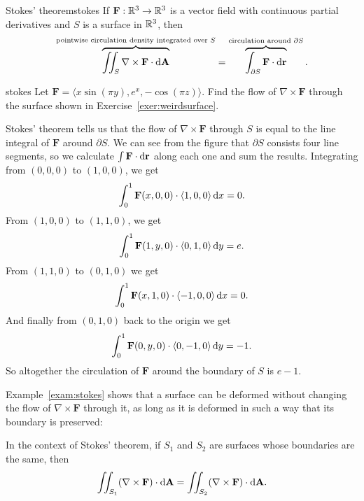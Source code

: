 \documentclass[svgnames]{watsonbook}
\begin{document}
\begin{theo}{Stokes' theorem}{stokes}
  If $\mathbf{F} : \mathbb{R}^3 \to \mathbb{R}^3$ is a vector field with continuous
  partial derivatives and $S$ is a surface in $\mathbb{R}^3$, then
  \[
    \overbrace{\iint_S \nabla \times \mathbf{F} \cdot
      \mathrm{d}\mathbf{A}}^{\text{pointwise circulation density integrated
        over $S$}} =
    \overbrace{\int_{\partial S} \mathbf{F} \cdot
      \mathrm{d}\mathbf{r}}^{\text{circulation around $\partial S$}}. 
  \]
\end{theo}

\begin{example}{}{stokes}
  Let $\mathbf{F} = \langle x \sin (\pi y), e^x, -\cos(\pi z)
  \rangle$. Find the flow of $\nabla \times \mathbf{F}$ through the
  surface shown in Exercise~\ref{exer:weirdsurface}.
\end{example}

\begin{solution} 
  Stokes' theorem tells us that the flow of $\nabla \times \mathbf{F}$
  through $S$ is equal to the line integral of $\mathbf{F}$ around
  $\partial S$. We can see from the figure that $\partial S$ consists
  four line segments, so we calculate $\int \mathbf{F} \cdot {\mathrm{d}}\mathbf{r}$
  along each one and sum the results. Integrating from $(0,0,0)$ to
  $(1,0,0)$, we get
  \[
    \int_0^1\mathbf{F}(x,0,0) \cdot \langle 1, 0, 0 \rangle  \, \mathrm{d} x =
    0. 
  \]
  From $(1,0,0)$ to $(1,1,0)$, we get
  \[
    \int_0^1\mathbf{F}(1,y,0) \cdot \langle 0, 1, 0 \rangle  \, \mathrm{d} y =
    e. 
  \]
  From $(1,1,0)$ to $(0,1,0)$ we get
  \[
    \int_0^1\mathbf{F}(x,1,0) \cdot \langle -1, 0, 0 \rangle  \, \mathrm{d} x = 0. 
  \]
  And finally from $(0,1,0)$ back to the origin we get
  \[
    \int_0^1\mathbf{F}(0,y,0) \cdot \langle 0, -1, 0 \rangle  \, \mathrm{d} y = -1. 
  \]
  So altogether the circulation of $\mathbf{F}$ around the boundary of
  $S$ is $\boxed{e-1}$. 
\end{solution}

Example~\ref{exam:stokes} shows that a surface can be deformed without
changing the  flow of $\nabla \times \mathbf{F}$ through it, as
long as it is deformed in such a way that its boundary is preserved: 

\begin{obs}{}{}
  In the context of Stokes' theorem, if $S_1$ and $S_2$ are surfaces
  whose boundaries are the same, then
  \[
    \iint_{S_1} (\nabla \times \mathbf{F}) \cdot \mathrm{d}\mathbf{A} =
  \iint_{S_2}
  (\nabla \times \mathbf{F})
  \cdot \mathrm{d}\mathbf{A}. 
\]
\end{obs}
\end{document}
